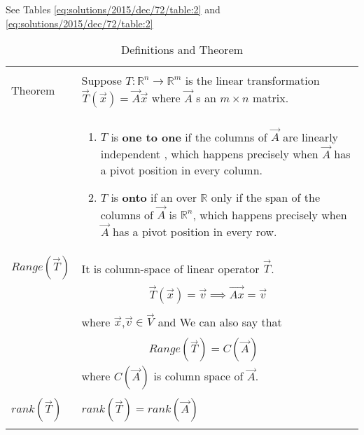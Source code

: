 See Tables     \ref{eq:solutions/2015/dec/72/table:2} and     \ref{eq:solutions/2015/dec/72/table:2}


\begin{table*}[ht!]
\centering
\begin{tabular}{|p{3cm}|p{15cm}|}
    \hline
	\multirow{3}{*}{Theorem} 
	&\\
	& Suppose $T:\mathbb{R}^{n}\rightarrow \mathbb{R}^{m}$ is the linear transformation $\vec{T}(\vec{x})=\vec{A}\vec{x}$ where $\vec{A}$ s an $m\times n$ matrix.\\
	&\\
	&{\begin{enumerate}
	    \item $T$ is \textbf{one to one} if the columns of $\vec{A}$ are linearly independent , which happens precisely when $\vec{A}$ has a pivot position in every column.
	    
	    \item $T$ is \textbf{onto} if an over $\mathbb{R}$  only if the span of the columns of $\vec{A}$ is $\mathbb{R}^{n}$, which happens precisely when $\vec{A}$ has a pivot position in every row.
	\end{enumerate}}\\
	\hline
	\multirow{3}{*}{$Range(\vec{T})$}
	&\\
	& It is column-space of linear operator $\vec{T}$.\\
	&\\
    &$\qquad\qquad\qquad\vec{T}(\vec{x})=\vec{v}
    \implies\vec{Ax}=\vec{v}$\\
    &\\
    & where $\vec{x}$,$\vec{v}\in\vec{V}$ and We can also say that\\
    &\\
    &$\qquad\qquad\qquad Range(\vec{T})=C(\vec{A})\label{eq:solutions/2015/dec/72/R}$\\
    &where $C(\vec{A})$ is column space of $\vec{A}$.\\
    \hline
    \multirow{3}{*}{$rank(\vec{T})$}
    &\\
&$rank(\vec{T})=rank(\vec{A})$\\
&\\
    \hline
\end{tabular}
    \caption{Definitions and Theorem }
\label{eq:solutions/2015/dec/72/table:1}
\end{table*}
\onecolumn
